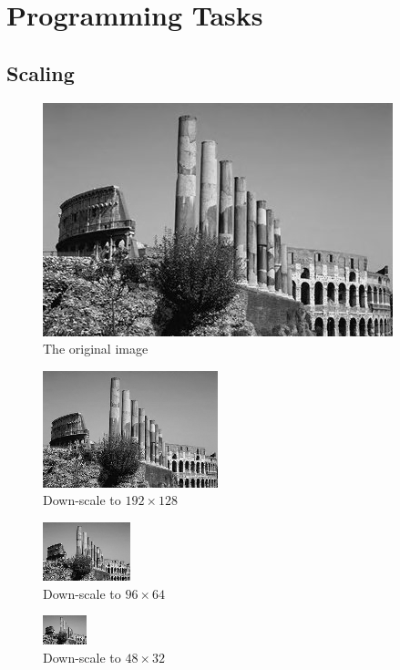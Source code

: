 \documentclass{article}
\begin{document}
\section{Programming Tasks}
\subsection{Scaling}

\begin{figure}[H]
\centering
\includegraphics[width=288pt]{../img/02.png}
\caption{The original image}
\label{scaleorigin}
\end{figure}

\begin{figure}[H]
\centering
\includegraphics[width=144pt]{../result/scale-192-128.png}
\caption{Down-scale to $192 \times 128$}
\label{scale192}
\end{figure}

\begin{figure}[H]
\centering
\includegraphics[width=72pt]{../result/scale-96-64.png}
\caption{Down-scale to $96 \times 64$}
\label{scale96}
\end{figure}

\begin{figure}[H]
\centering
\includegraphics[width=36pt]{../result/scale-48-32.png}
\caption{Down-scale to $48 \times 32$}
\label{scale48}
\end{figure}
\end{document}
